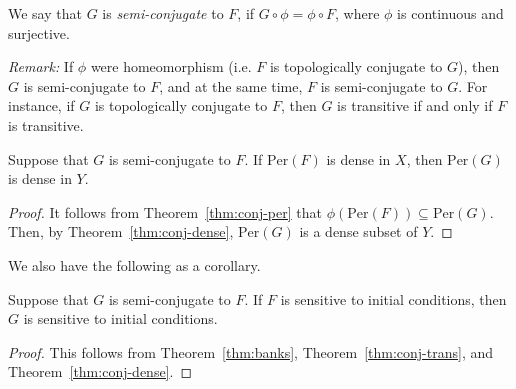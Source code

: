 \documentclass[12pt,draft,twoside]{book}
\begin{document}
  \begin{definition}
    We say that $G$ is \textit{semi-conjugate} to $F$, if $G\circ\phi = \phi\circ F$, where $\phi$ is continuous and surjective.
  \end{definition}
  \textit{Remark:} If $\phi$ were homeomorphism (i.e. $F$ is topologically conjugate to $G$), then $G$ is semi-conjugate to $F$, and at the same time, $F$ is semi-conjugate to $G$.
  For instance, if $G$ is topologically conjugate to $F$, then $G$ is transitive if and only if $F$ is transitive.

  \begin{corollary}
    Suppose that $G$ is semi-conjugate to $F$.
    If $\mathrm{Per}(F)$ is dense in $X$, then $\mathrm{Per}(G)$ is dense in $Y$.
    \label{cor:conj-dense-per}
    \begin{proof}
      It follows from Theorem~\ref{thm:conj-per} that $\phi(\mathrm{Per}(F)) \subseteq \mathrm{Per}(G)$.
      Then, by Theorem~\ref{thm:conj-dense}, $\mathrm{Per}(G)$ is a dense subset of $Y$.
    \end{proof}
\end{corollary}
We also have the following as a corollary.
\begin{corollary}
  Suppose that $G$ is semi-conjugate to $F$.
  If $F$ is sensitive to initial conditions, then $G$ is sensitive to initial conditions.
  \label{cor:conj-sdic}
  \begin{proof}
  This follows from Theorem~\ref{thm:banks}, Theorem~\ref{thm:conj-trans}, and Theorem~\ref{thm:conj-dense}.
  \end{proof}
\end{corollary}





\printindex
\end{document}
